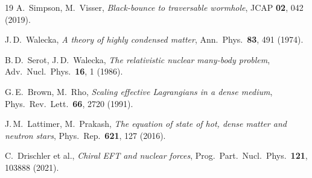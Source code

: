 \documentclass[11pt,a4paper]{article}
\begin{document}
\begin{thebibliography}{19}
A.~Simpson, M.~Visser,
\emph{Black-bounce to traversable wormhole},
JCAP \textbf{02}, 042 (2019).

J.\,D.~Walecka,
\emph{A theory of highly condensed matter},
Ann.\ Phys.\ \textbf{83}, 491 (1974).

B.\,D.~Serot, J.\,D.~Walecka,
\emph{The relativistic nuclear many-body problem},
Adv.\ Nucl.\ Phys.\ \textbf{16}, 1 (1986).

G.\,E.~Brown, M.~Rho,
\emph{Scaling effective Lagrangians in a dense medium},
Phys.\ Rev.\ Lett.\ \textbf{66}, 2720 (1991).

J.\,M.~Lattimer, M.~Prakash,
\emph{The equation of state of hot, dense matter and neutron stars},
Phys.\ Rep.\ \textbf{621}, 127 (2016).

C.~Drischler et al.,
\emph{Chiral EFT and nuclear forces},
Prog.\ Part.\ Nucl.\ Phys.\ \textbf{121}, 103888 (2021).

\end{thebibliography}
\end{document}
